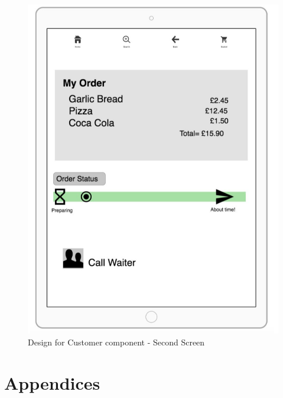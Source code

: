 \documentclass[11pt, a4paper]{report}
\begin{document}
\begin{figure}
\centering
\includegraphics[scale=0.5]{Figures/Customer2.png}
\caption{Design for Customer component - Second Screen}
\end{figure}

\printbibliography

\chapter{Appendices}
\end{document}
